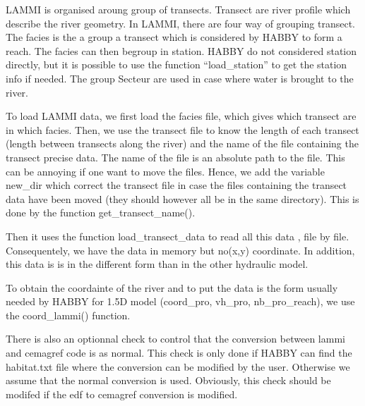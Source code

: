 \documentclass[letterpaper,10pt,english]{sphinxmanual}
\begin{document}
\begin{fulllineitems}
LAMMI is organised aroung group of transects. Transect are river profile which describe the river geometry.
In LAMMI, there are four way of grouping transect. The facies is the a group a transect which is considered by HABBY
to form a reach. The facies can then begroup in station. HABBY do not considered station directly, but it is
possible to use the function ``load\_station'' to get the station info if needed. The group Secteur are used in case
where water is brought to the river.

To load LAMMI data, we first load the facies file, which gives which transect are in which facies. Then, we use
the transect file to know the length of each transect (length between transects along the river) and the
name of the file containing the transect precise data. The name of the file is an absolute path to the file.
This can be annoying if one want to move the files. Hence, we add the variable new\_dir which correct the transect
file in case the files containing the transect data have been moved (they should however all be in the same
directory). This is done by the function get\_transect\_name().

Then it uses the function load\_transect\_data to read all this data , file by file. Consequentely, we have
the data in memory but no(x,y) coordinate. In addition, this data is is in the different form than in the other
hydraulic model.

To obtain the coordainte of the river and to put the data is the form usually needed by HABBY for 1.5D model
(coord\_pro, vh\_pro, nb\_pro\_reach), we use the coord\_lammi() function.

There is also an optionnal check to control that the conversion between lammi and cemagref code is as normal.
This check is only done if HABBY can find the habitat.txt file where the conversion can be modified by the user.
Otherwise we assume that the normal conversion is used. Obviously, this check should be modifed if the edf
to cemagref conversion is modified.

\end{fulllineitems}

\end{document}
